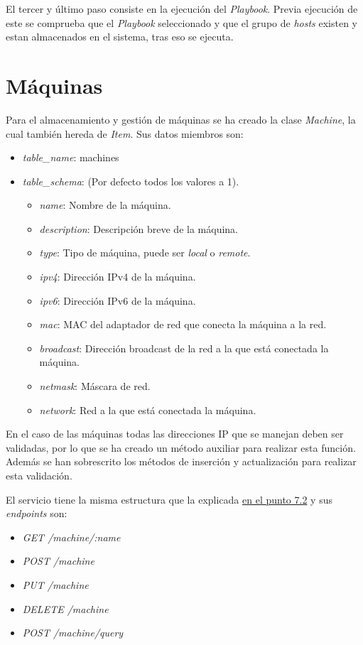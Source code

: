 El tercer y último paso consiste en la ejecución del \textit{Playbook}. Previa ejecución de este se comprueba que el \textit{Playbook} seleccionado y que el grupo de \textit{hosts} existen y estan almacenados en el sistema, tras eso se ejecuta.



\section{Máquinas}

Para el almacenamiento y gestión de máquinas se ha creado la clase \textit{Machine}, la cual también hereda de \textit{Item}. Sus datos miembros son:
\begin{itemize}
	\item \textit{table\_name}: machines
	\item \textit{table\_schema}: (Por defecto todos los valores a 1).
	\begin{itemize}
		\item \textit{name}: Nombre de la máquina.
		\item \textit{description}: Descripción breve de la máquina.
		\item \textit{type}: Tipo de máquina, puede ser \textit{local} o \textit{remote}.
		\item \textit{ipv4}: Dirección IPv4 de la máquina.
		\item \textit{ipv6}: Dirección IPv6 de la máquina.
		\item \textit{mac}: MAC del adaptador de red que conecta la máquina a la red.
		\item \textit{broadcast}: Dirección broadcast de la red a la que está conectada la máquina.
		\item \textit{netmask}: Máscara de red.
		\item \textit{network}: Red a la que está conectada la máquina.
	\end{itemize}
\end{itemize}


\bigskip
En el caso de las máquinas todas las direcciones IP que se manejan deben ser validadas, por lo que se ha creado un método auxiliar para realizar esta función. Además se han sobrescrito los métodos de inserción y actualización para realizar esta validación.

\bigskip
El servicio tiene la misma estructura que la explicada \hyperref[sec:servicios]{en el punto 7.2} y sus \textit{endpoints} son:
\begin{itemize}
	\item \textit{GET /machine/:name}
	\item \textit{POST /machine}
	\item \textit{PUT /machine}
	\item \textit{DELETE /machine}
	\item \textit{POST /machine/query}
\end{itemize}

